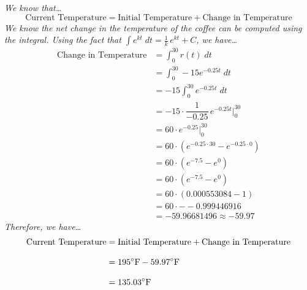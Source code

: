 \documentclass[12pt,letterpaper]{exam}
\begin{document}
\begin{questions}
{\itshape \tsol We know that\dots
	\[
	\text{Current Temperature}= \text{Initial Temperature} + \text{Change in Temperature}
	\]
We know the net change in the temperature of the coffee can be computed using the integral. Using the fact that $\displaystyle \int e^{kt} \;dt= \frac{1}{k}\, e^{kt} + C$, we have\dots
	\[
	\begin{aligned}
	\text{Change in Temperature}&= \int_0^{30} r(t) \;dt \\[0.3cm]
	&= \int_0^{30} -15 e^{-0.25t} \;dt \\[0.3cm]
	&= -15 \int_0^{30} e^{-0.25t} \;dt \\[0.3cm]
	&= -15 \cdot \dfrac{1}{-0.25}\, e^{-0.25t} \bigg|_0^{30} \\[0.3cm]
	&= 60 \cdot e^{-0.25} \bigg|_0^{30} \\[0.3cm]
	&= 60 \cdot \left(e^{-0.25 \cdot 30} - e^{-0.25 \cdot 0} \right) \\[0.3cm]
	&= 60 \cdot \left(e^{-7.5} - e^{0} \right) \\[0.3cm]
	&= 60 \cdot \left(e^{-7.5} - e^{0} \right) \\[0.3cm]
	&= 60 \cdot (0.000553084 - 1) \\[0.3cm]
	&= 60 \cdot --0.999446916 \\[0.3cm]
	&= -59.96681496 \approx -59.97
	\end{aligned}
	\]
Therefore, we have\dots
	\[
	\begin{aligned}
	\text{Current Temperature}&= \text{Initial Temperature} + \text{Change in Temperature} \\[0.3cm]
	&= 195^\circ \text{\normalfont F} - 59.97^\circ \text{\normalfont F} \\[0.3cm]
	&= 135.03^\circ \text{\normalfont F}
	\end{aligned}
	\]
}

\end{questions}
\end{document}
